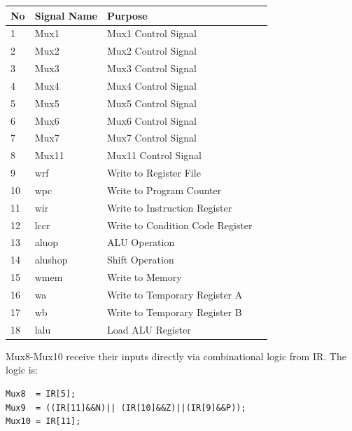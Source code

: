 \documentclass[11pt]{report}
\begin{document}
\begin{center}
    \begin{tabular}{ | l | l | l | p{5cm} |}
    \hline
    No & Signal Name & Purpose \\ \hline
    1 & Mux1 & Mux1 Control Signal \\ \hline
    2 & Mux2 & Mux2 Control Signal \\ \hline
    3 & Mux3 & Mux3 Control Signal \\ \hline
    4 & Mux4 & Mux4 Control Signal \\ \hline
    5 & Mux5 & Mux5 Control Signal \\ \hline
    6 & Mux6 & Mux6 Control Signal \\ \hline
    7 & Mux7 & Mux7 Control Signal \\ \hline
    8 & Mux11 & Mux11 Control Signal \\ \hline
    9 & wrf & Write to Register File \\ \hline
    10 & wpc & Write to Program Counter \\ \hline
    11 & wir & Write to Instruction Register \\ \hline
    12 & lccr & Write to Condition Code Register \\ \hline
    13 & aluop & ALU Operation \\ \hline
    14 & alushop & Shift Operation \\ \hline
    15 & wmem & Write to Memory \\ \hline
    16 & wa & Write to Temporary Register A \\ \hline
    17 & wb & Write to Temporary Register B \\ \hline
    18 & lalu & Load ALU Register \\ \hline
    \end{tabular}
\end{center}

Mux8-Mux10 receive their inputs directly via combinational logic from IR. The logic is:
\begin{lstlisting}
Mux8  = IR[5];
Mux9  = ((IR[11]&&N)|| (IR[10]&&Z)||(IR[9]&&P));
Mux10 = IR[11];
\end{lstlisting}
\end{document}
